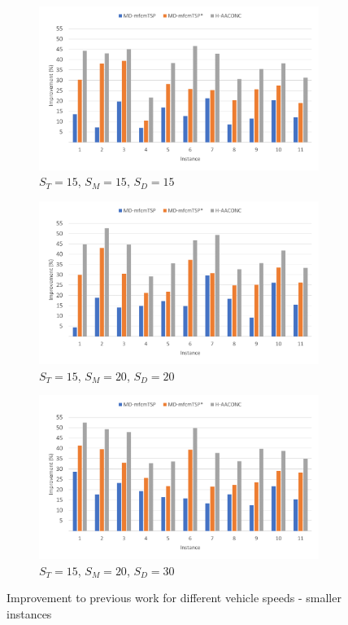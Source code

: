 \documentclass{article}
\begin{document}
	\begin{figure}[h]
		\centering
		\begin{subfigure}{0.33\textwidth}
			\centering
			\includegraphics[scale=0.42]{small_15-15-15}\;
			\caption{$S_T=15$, $S_M=15$, $S_D=15$}
			\label{fig:15-15-15}
		\end{subfigure}
		\begin{subfigure}{0.33\textwidth}
			\centering
			\includegraphics[scale=0.42]{small_15-20-20}\;
			\caption{$S_T=15$, $S_M=20$, $S_D=20$}
			\label{fig:15-20-20}
		\end{subfigure}
		\begin{subfigure}{0.33\textwidth}
			\centering
			\includegraphics[scale=0.42]{small_15-20-30}\;
			\caption{$S_T=15$, $S_M=20$, $S_D=30$}
			\label{fig:15-20-30}
		\end{subfigure}
		    \caption{Improvement to previous work for different vehicle speeds - smaller instances}
		    \label{fig:small_instances}
	\end{figure}
	
\end{document}
